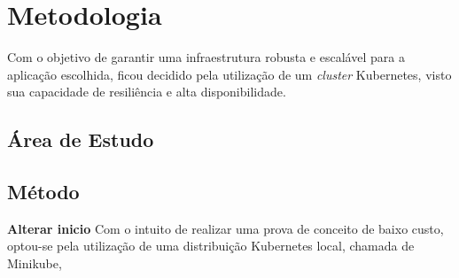 \chapter{Metodologia}

Com o objetivo de garantir uma infraestrutura robusta e escalável para a aplicação escolhida, ficou decidido pela utilização de um \textit{cluster} Kubernetes, visto sua capacidade de resiliência e alta disponibilidade.


\section{Área de Estudo}



\section{Método}

\textbf{Alterar inicio} Com o intuito de realizar uma prova de conceito de baixo custo, optou-se pela utilização de uma distribuição Kubernetes local, chamada de Minikube, 



